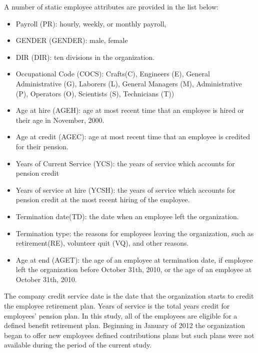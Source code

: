 \documentclass[12pt,letterpaper]{article}
\begin{document}
A number of static employee attributes are provided in the list below:
\begin{itemize}
	\item Payroll (PR): hourly, weekly, or monthly payroll,
	\item GENDER (GENDER): male, female
	\item DIR (DIR): ten divisions in the organization.
	\item Occupational Code (COCS): Crafts(C), Engineers (E), General Administrative (G), Laborers (L), General Managers (M),  Administrative (P),  Operators (O), Scientists (S), Technicians (T))
	\item Age at hire (AGEH): age at most recent time that an employee is hired or their age in November, 2000.
	\item Age at credit (AGEC): age at most recent time that an employee is credited for their pension.
	\item Years of Current Service (YCS): the years of service which accounts for pension credit
	\item Years of service at hire (YCSH): the years of service which accounts for pension credit at the most recent hiring of the employee.
	\item Termination date(TD): the date when an employee left the organization.
	\item Termination type: the reasons for employees leaving the organization, such as retirement(RE),  volunteer quit (VQ), and other reasons.
	\item Age at end (AGET): the age of an employee at termination date, if employee left the organization before October 31th, 2010, or the age of an employee at October 31th, 2010.
\end{itemize}


The company credit service date is the date that the organization starts to credit the employee retirement plan. Years of service is the total years credit for employees' pension plan. In this study, all of the employees are eligible for a defined benefit retirement plan. Beginning in January of 2012 the organization began to offer new employees defined contributions plans but such plans were not available during the period of the current study.
\end{document}
